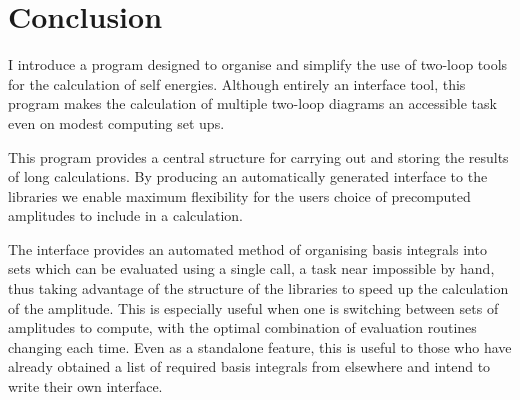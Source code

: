 %
%



\section{Conclusion}

I introduce a program designed to organise and simplify the use of two-loop tools for the calculation of self energies.  Although entirely an interface tool, this program makes the calculation of multiple two-loop diagrams an accessible task even on modest computing set ups.

This program provides a central structure for carrying out and storing the results of long calculations.  By producing an automatically generated interface to the \tsil libraries we enable maximum flexibility for the users choice of precomputed amplitudes to include in a calculation.

The \tsil interface provides an automated method of organising basis integrals into sets which can be evaluated using a single \tsil call, a task near impossible by hand, thus taking advantage of the structure of the \tsil libraries to speed up the calculation of the amplitude.  This is especially useful when one is switching between sets of amplitudes to compute, with the optimal combination of evaluation routines changing each time. Even as a standalone feature, this is useful to those who have already obtained a list of required basis integrals from elsewhere and intend to write their own \tsil interface.




{}


  
